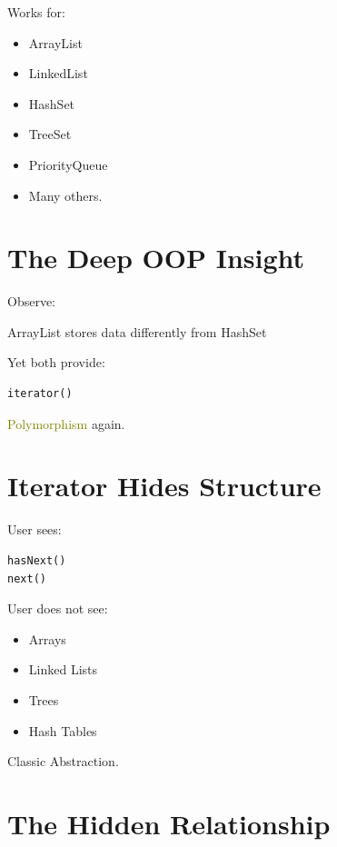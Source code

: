 \documentclass[11pt,a4paper]{book}
\begin{document}

Works for:
\begin{itemize}
\item ArrayList
\item LinkedList
\item HashSet
\item TreeSet
\item PriorityQueue
\item Many others.
\end{itemize}

\section{The Deep OOP Insight}

Observe:

\textcolor{RosettaRoyalPurple}{ArrayList}
stores data differently from
\textcolor{RosettaRoyalPurple}{HashSet}

Yet both provide:

\begin{verbatim} 
iterator()
\end{verbatim}

\textcolor{olive}{Polymorphism} again.

\section{Iterator Hides Structure}

User sees:

\begin{verbatim} 
hasNext()
next()
\end{verbatim}

User does not see:
\begin{itemize}
\item [ ]Arrays
\item [ ]Linked Lists
\item [ ]Trees
\item [ ]Hash Tables
\end{itemize}

Classic \textcolor{RosettaDeepGreen}{Abstraction}.

\section{The Hidden Relationship}
\end{document}

